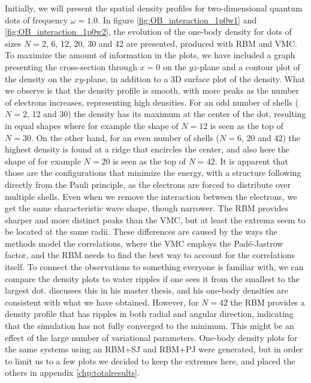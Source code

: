 Initially, we will present the spatial density profiles for two-dimensional quantum dots of frequency $\omega=1.0$. In figure \eqref{fig:OB_interaction_1p0w1} and \eqref{fig:OB_interaction_1p0w2}, the evolution of the one-body density for dots of sizes $N=2$, 6, 12, 20, 30 and 42 are presented, produced with RBM and VMC. To maximize the amount of information in the plots, we have included a graph presenting the cross-section through $x=0$ on the $yz$-plane and a contour plot of the density on the $xy$-plane, in addition to a 3D surface plot of the density. What we observe is that the density profile is smooth, with more peaks as the number of electrons increases, representing high densities. For an odd number of shells ($N=2$, 12 and 30) the density has its maximum at the center of the dot, resulting in equal shapes where for example the shape of $N=12$ is seen as the top of $N=30$. On the other hand, for an even number of shells ($N=6$, 20 and 42) the highest density is found at a ridge that encircles the center, and also here the shape of for example $N=20$ is seen as the top of $N=42$. It is apparent that those are the configurations that minimize the energy, with a structure following directly from the Pauli principle, as the electrons are forced to distribute over multiple shells. Even when we remove the interaction between the electrons, we get the same characteristic wave shape, though narrower. The RBM provides sharper and more distinct peaks than the VMC, but at least the extrema seem to be located at the same radii. These differences are caused by the ways the methods model the correlations, where the VMC employs the Padé-Jastrow factor, and the RBM needs to find the best way to account for the correlations itself. To connect the observations to something everyone is familiar with, we can compare the density plots to water ripples if one sees it from the smallest to the largest dot. \citet{hogberget_quantum_2013} discusses this in his master thesis, and his one-body densities are consistent with what we have obtained. However, for $N=42$ the RBM provides a density profile that has ripples in both radial and angular direction, indicating that the simulation has not fully converged to the minimum. This might be an effect of the large number of variational parameters. One-body density plots for the same systems using an RBM+SJ and RBM+PJ were generated, but in order to limit us to a few plots we decided to keep the extremes here, and placed the others in appendix \ref{chp:totalresults}.

